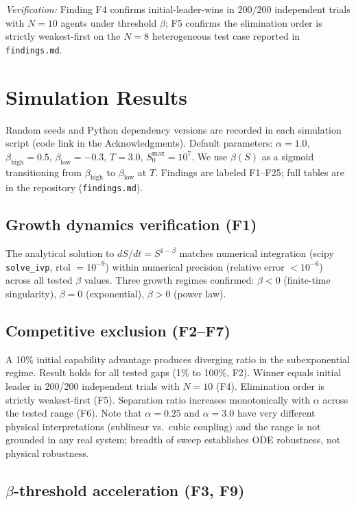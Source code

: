 \documentclass[11pt,letterpaper]{article}
\theoremstyle{plain}
\theoremstyle{definition}
\theoremstyle{remark}
\newcommand{\betaH}{\beta_{\mathrm{high}}}
\newcommand{\betaL}{\beta_{\mathrm{low}}}
\begin{document}
\textit{Verification:}
Finding F4 confirms initial-leader-wins in $200/200$ independent trials with
$N = 10$ agents under threshold $\beta$; F5 confirms the elimination
order is strictly weakest-first on the $N = 8$ heterogeneous test case
reported in \texttt{findings.md}.

\section{Simulation Results}
\label{sec:simulations}

Random seeds and Python dependency versions are recorded in each
simulation script (code link in the Acknowledgments).
Default parameters: $\alpha = 1.0$, $\betaH = 0.5$, $\betaL = -0.3$,
$T = 3.0$, $S_0^{\max} = 10^7$.
We use $\beta(S)$ as a sigmoid transitioning from $\betaH$ to $\betaL$ at $T$.
Findings are labeled F1--F25; full tables are in the repository
(\texttt{findings.md}).

\subsection{Growth dynamics verification (F1)}

The analytical solution to $dS/dt = S^{1-\beta}$ matches numerical integration
(scipy \texttt{solve\_ivp}, rtol $= 10^{-9}$) within numerical precision
(relative error $< 10^{-6}$) across all tested $\beta$ values.
Three growth regimes confirmed: $\beta < 0$ (finite-time singularity),
$\beta = 0$ (exponential), $\beta > 0$ (power law).

\subsection{Competitive exclusion (F2--F7)}

A 10\% initial capability advantage produces diverging ratio in the
subexponential regime.
Result holds for all tested gaps (1\% to 100\%, F2).
Winner equals initial leader in 200/200 independent trials with $N = 10$ (F4).
Elimination order is strictly weakest-first (F5).
Separation ratio increases monotonically with $\alpha$ across the tested
range (F6).
Note that $\alpha = 0.25$ and $\alpha = 3.0$ have very different physical
interpretations (sublinear vs.\ cubic coupling) and the range is not
grounded in any real system; breadth of sweep establishes ODE robustness,
not physical robustness.

\subsection{$\beta$-threshold acceleration (F3, F9)}
\end{document}
